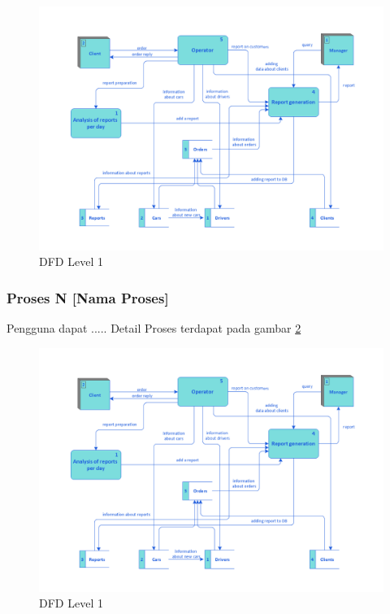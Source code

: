       \begin{figure}[htp]
        \centering
        \includegraphics[width=\linewidth]{images/bab3/Taxi-service-dfd.png}
        \caption{DFD Level 1}
        \label{dfd1a}
      \end{figure}
      
  \subsubsection{Proses N [Nama Proses]}
  Pengguna dapat ..... Detail Proses terdapat pada gambar \ref{dfd1n}
      \begin{figure}[H]
        \centering
        \includegraphics[width=\linewidth]{images/bab3/Taxi-service-dfd.png}
        \caption{DFD Level 1}
        \label{dfd1n}
      \end{figure}
  
